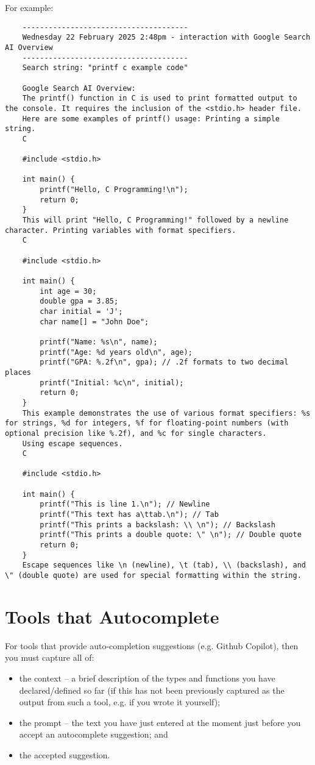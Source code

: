 \documentclass{article}
\begin{document}
For example:

\nolinenumbers
{}
\begin{lstlisting}
	--------------------------------------
	Wednesday 22 February 2025 2:48pm - interaction with Google Search AI Overview
	--------------------------------------
	Search string: "printf c example code"
	
	Google Search AI Overview:
	The printf() function in C is used to print formatted output to the console. It requires the inclusion of the <stdio.h> header file.
	Here are some examples of printf() usage: Printing a simple string.
	C
	
	#include <stdio.h>
	
	int main() {
		printf("Hello, C Programming!\n");
		return 0;
	}
	This will print "Hello, C Programming!" followed by a newline character. Printing variables with format specifiers.
	C
	
	#include <stdio.h>
	
	int main() {
		int age = 30;
		double gpa = 3.85;
		char initial = 'J';
		char name[] = "John Doe";
		
		printf("Name: %s\n", name);
		printf("Age: %d years old\n", age);
		printf("GPA: %.2f\n", gpa); // .2f formats to two decimal places
		printf("Initial: %c\n", initial);
		return 0;
	}
	This example demonstrates the use of various format specifiers: %s for strings, %d for integers, %f for floating-point numbers (with optional precision like %.2f), and %c for single characters.
	Using escape sequences.
	C
	
	#include <stdio.h>
	
	int main() {
		printf("This is line 1.\n"); // Newline
		printf("This text has a\ttab.\n"); // Tab
		printf("This prints a backslash: \\ \n"); // Backslash
		printf("This prints a double quote: \" \n"); // Double quote
		return 0;
	}
	Escape sequences like \n (newline), \t (tab), \\ (backslash), and \" (double quote) are used for special formatting within the string.
\end{lstlisting}
\linenumbers

\section{Tools that Autocomplete}

For tools that provide auto-completion suggestions (e.g. Github Copilot), then you must capture all of:
\begin{itemize}
\item the context -- a brief description of the types and functions you have declared/defined so far (if this has not been
previously captured as the output from such a tool, e.g. if you wrote it yourself);
\item the prompt -- the text you have just entered at the moment just before you accept an autocomplete suggestion; and
\item the accepted suggestion.
\end{itemize}
\end{document}
